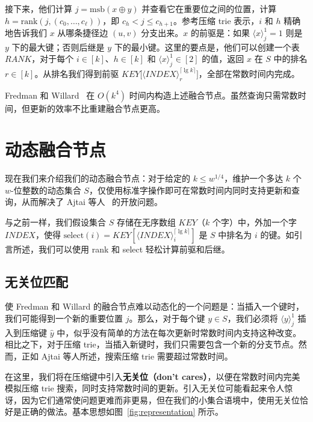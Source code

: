 \documentclass[11pt,a4paper]{ctexart}
\newcommand{\lpiece}[3]{\langle #1 \rangle_{#2}^{#3}}
\newcommand{\XOR}{\oplus}
\newcommand{\MSB}{\text{msb}}
\newcommand{\RANK}{\text{rank}}
\newcommand{\SELECT}{\text{select}}
\newcommand{\ceiling}[1]{\lceil #1 \rceil}
\begin{document}
接下来，他们计算 $j = \MSB(x \XOR y)$ 并查看它在重要位之间的位置，计算 $h = \RANK(j, (c_0, \dots, c_\ell))$，即 $c_h < j \leq c_{h+1}$。参考压缩 trie 表示，$i$ 和 $h$ 精确地告诉我们 $x$ 从哪条捷径边 $(u, v)$ 分支出来。$x$ 的前驱是：如果 $\lpiece{x}{j}{1} = 1$ 则是 $y$ 下的最大键；否则后继是 $y$ 下的最小键。这里的要点是，他们可以创建一个表 $RANK$，对于每个 $i \in [k]$、$h \in [k]$ 和 $\lpiece{x}{j}{1} \in [2]$ 的值，返回 $x$ 在 $S$ 中的排名 $r \in [k]$。从排名我们得到前驱 $KEY\bigl[\lpiece{INDEX}{r}{\ceiling{\lg k}}\bigr]$，全部在常数时间内完成。

Fredman 和 Willard~\cite{fredman93fusion} 在 $O(k^4)$ 时间内构造上述融合节点。虽然查询只需常数时间，但更新的效率不比重建融合节点更高。

\section{动态融合节点}\label{sec:dyn-fusion}

现在我们来介绍我们的动态融合节点：对于给定的 $k \leq w^{1/4}$，维护一个多达 $k$ 个 $w$-位整数的动态集合 $S$，仅使用标准字操作即可在常数时间内同时支持更新和查询，从而解决了 Ajtai 等人~\cite{ajtai84hashing} 的开放问题。

与之前一样，我们假设集合 $S$ 存储在无序数组 $KEY$（$k$ 个字）中，外加一个字 $INDEX$，使得 $\SELECT(i) = KEY[\lpiece{INDEX}{i}{\ceiling{\lg k}}]$ 是 $S$ 中排名为 $i$ 的键。如引言所述，我们可以使用 rank 和 select 轻松计算前驱和后继。

\subsection{无关位匹配}

使 Fredman 和 Willard 的融合节点难以动态化的一个问题是：当插入一个键时，我们可能得到一个新的重要位置 $j$。那么，对于每个键 $y \in S$，我们必须将 $\lpiece{y}{j}{1}$ 插入到压缩键 $\hat{y}$ 中，似乎没有简单的方法在每次更新时常数时间内支持这种改变。相比之下，对于压缩 trie，当插入新键时，我们只需要包含一个新的分支节点。然而，正如 Ajtai 等人所述，搜索压缩 trie 需要超过常数时间。

在这里，我们将在压缩键中引入\textbf{无关位（don't cares）}，以便在常数时间内完美模拟压缩 trie 搜索，同时支持常数时间的更新。引入无关位可能看起来令人惊讶，因为它们通常使问题更难而非更易，但在我们的小集合语境中，使用无关位恰好是正确的做法。基本思想如图~\ref{fig:representation} 所示。
\end{document}
